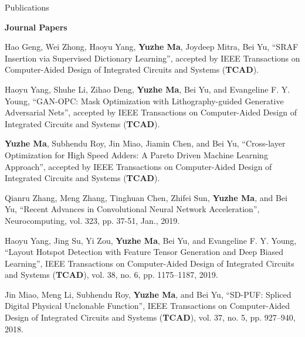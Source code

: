 \begin{rSection}{Publications}

\iffalse
\textbf{Books / Book Chapters}
\begin{description}[font=\normalfont]

\end{description}
\fi

\textbf{Journal Papers}
\begin{description}[font=\normalfont]
\iffalse
\item \textbf{Submitted}

\fi


\item[{[J6]}]{
    Hao Geng, Wei Zhong, Haoyu Yang, \textbf{Yuzhe Ma}, Joydeep Mitra, Bei Yu, 
        ``SRAF Insertion via Supervised Dictionary Learning'', 
        accepted by IEEE Transactions on Computer-Aided Design of Integrated Circuits and Systems (\textbf{TCAD}).
}

\item[{[J5]}]{
    Haoyu Yang, Shuhe Li, Zihao Deng, \textbf{Yuzhe Ma}, Bei Yu, and Evangeline F. Y. Young, 
    ``GAN-OPC: Mask Optimization with Lithography-guided Generative Adversarial Nets'',
    accepted by IEEE Transactions on Computer-Aided Design of Integrated Circuits and Systems (\textbf{TCAD}).
}

\item[{[J4]}]{
	\textbf{Yuzhe Ma}, Subhendu Roy, Jin Miao, Jiamin Chen, and Bei Yu,
	``Cross-layer Optimization for High Speed Adders: A Pareto Driven Machine Learning Approach'', 
	accepted by IEEE Transactions on Computer-Aided Design of Integrated Circuits and Systems (\textbf{TCAD}).
}

\item[{[J3]}]{
	Qianru Zhang, Meng Zhang, Tinghuan Chen, Zhifei Sun, \textbf{Yuzhe Ma}, and Bei Yu,
	``Recent Advances in Convolutional Neural Network Acceleration'', 
	Neurocomputing, vol. 323, pp. 37-51, Jan., 2019.
}

\item[{[J2]}]{
	Haoyu Yang, Jing Su, Yi Zou, \textbf{Yuzhe Ma}, Bei Yu, and Evangeline F. Y. Young, 
	``Layout Hotspot Detection with Feature Tensor Generation and Deep Biased Learning'', 
	IEEE Transactions on Computer-Aided Design of Integrated Circuits and Systems (\textbf{TCAD}), vol. 38, no. 6, pp. 1175--1187, 2019.
}

\item[{[J1]}]{
	Jin Miao, Meng Li, Subhendu Roy, \textbf{Yuzhe Ma}, and Bei Yu, 
	``SD-PUF: Spliced Digital Physical Unclonable Function'', 
	IEEE Transactions on Computer-Aided Design of Integrated Circuits and Systems (\textbf{TCAD}), vol. 37, no. 5, pp. 927--940, 2018.
}
\end{description}



\end{rSection}
